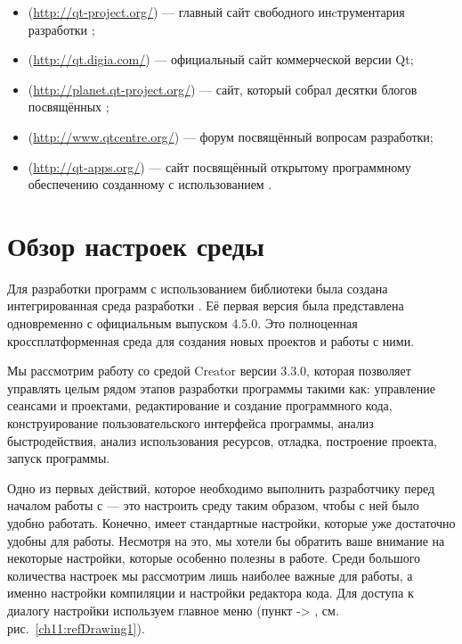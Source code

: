 \begin{itemize}
\item {} ({\small\url{http://qt-project.org/}}) --- главный сайт свободного инcтрументария разработки
;
\item {} ({\small\url{http://qt.digia.com/}}) --- официальный сайт коммерческой версии Qt;
\item {} ({\small\url{http://planet.qt-project.org/}}) --- сайт, который собрал десятки блогов посвящённых
;
\item {} ({\small\url{http://www.qtcentre.org/}}) --- форум посвящённый
вопросам разработки;
\item {} ({\small\url{http://qt-apps.org/}}) --- сайт посвящённый
открытому программному обеспечению созданному с использованием .
\end{itemize}

\section[Обзор настроек среды \Sys{Qt Creator}]{Обзор настроек среды }
Для разработки программ с использованием библиотеки  была создана интегрированная среда разработки
. Её первая версия была представлена
одновременно с официальным выпуском  4.5.0. Это полноценная кроссплатформенная
среда для создания новых проектов и работы с ними.

Мы рассмотрим работу со средой  Creator версии 3.3.0, которая позволяет управлять целым рядом этапов
разработки программы такими как: управление сеансами и проектами, редактирование и создание программного кода,
конструирование пользовательского интерфейса программы, анализ быстродействия, анализ использования ресурсов, отладка,
построение проекта, запуск программы.

Одно из первых действий, которое необходимо выполнить разработчику перед началом работы с  --- это
настроить среду таким образом, чтобы с ней было удобно работать. Конечно, 
имеет стандартные настройки, которые уже достаточно удобны для работы. Несмотря на это, мы хотели бы обратить ваше
внимание на некоторые настройки, которые особенно полезны в работе. Среди большого количества настроек мы рассмотрим
лишь наиболее важные для работы, а именно настройки компиляции и настройки редактора кода. Для доступа к диалогу
настройки используем главное меню (пункт -> , см. рис.~\ref{ch11:refDrawing1}).

